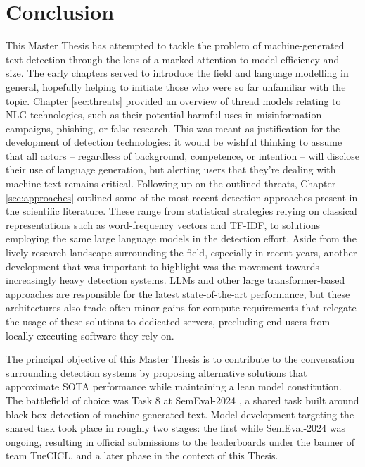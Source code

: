 \section{Conclusion}
\label{sec:conclusion}

This Master Thesis has attempted to tackle the problem of machine-generated text detection through the lens of a marked attention to model efficiency and size.
The early chapters served to introduce the field and language modelling in general, hopefully helping to initiate those who were so far unfamiliar with the topic.
Chapter \ref{sec:threats} provided an overview of thread models relating to NLG technologies, such as their potential harmful uses in misinformation campaigns, phishing, or false research.
This was meant as justification for the development of detection technologies: it would be wishful thinking to assume that all actors -- regardless of background, competence, or intention -- will disclose their use of language generation, but alerting users that they're dealing with machine text remains critical.
Following up on the outlined threats, Chapter \ref{sec:approaches} outlined some of the most recent detection approaches present in the scientific literature.
These range from statistical strategies relying on classical representations such as word-frequency vectors and TF-IDF, to solutions employing the same large language models in the detection effort.
Aside from the lively research landscape surrounding the field, especially in recent years, another development that was important to highlight was the movement towards increasingly heavy detection systems.
LLMs and other large transformer-based approaches are responsible for the latest state-of-the-art performance, but these architectures also trade often minor gains for compute requirements that relegate the usage of these solutions to dedicated servers, precluding end users from locally executing software they rely on.

The principal objective of this Master Thesis is to contribute to the conversation surrounding detection systems by proposing alternative solutions that approximate SOTA performance while maintaining a lean model constitution.
The battlefield of choice was Task 8 at SemEval-2024 \citep{wang2024semeval}, a shared task built around black-box detection of machine generated text.
Model development targeting the shared task took place in roughly two stages: the first while SemEval-2024 was ongoing, resulting in official submissions to the leaderboards under the banner of team TueCICL, and a later phase in the context of this Thesis.

